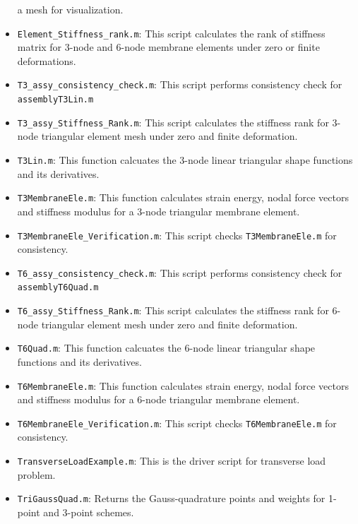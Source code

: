 \documentclass[../main.tex]{subfiles}
\begin{document}
\begin{itemize}
  a mesh for visualization.
\item \texttt{Element\_Stiffness\_rank.m}: This script calculates the
  rank of stiffness matrix for 3-node and 6-node membrane elements
  under zero or finite deformations.
\item \texttt{T3\_assy\_consistency\_check.m}: This script performs
  consistency check for \texttt{assemblyT3Lin.m}
\item \texttt{T3\_assy\_Stiffness\_Rank.m}: This script calculates the
  stiffness rank for 3-node triangular element mesh under zero and
  finite deformation.
\item \texttt{T3Lin.m}: This function calcuates the 3-node linear
  triangular shape functions and its derivatives.
\item \texttt{T3MembraneEle.m}: This function calculates strain
  energy, nodal force vectors and stiffness modulus for a 3-node
  triangular membrane element.
\item \texttt{T3MembraneEle\_Verification.m}: This script checks
  \texttt{T3MembraneEle.m} for consistency.
\item \texttt{T6\_assy\_consistency\_check.m}: This script performs
  consistency check for \texttt{assemblyT6Quad.m}
\item \texttt{T6\_assy\_Stiffness\_Rank.m}: This script calculates the
  stiffness rank for 6-node triangular element mesh under zero and
  finite deformation.
\item \texttt{T6Quad.m}: This function calcuates the 6-node linear
  triangular shape functions and its derivatives.
\item \texttt{T6MembraneEle.m}: This function calculates strain
  energy, nodal force vectors and stiffness modulus for a 6-node
  triangular membrane element.
\item \texttt{T6MembraneEle\_Verification.m}: This script checks
  \texttt{T6MembraneEle.m} for consistency.
\item \texttt{TransverseLoadExample.m}: This is the driver script for
  transverse load problem.
\item \texttt{TriGaussQuad.m}: Returns the Gauss-quadrature points and
  weights for 1-point and 3-point schemes.
\end{itemize}
\end{document}
